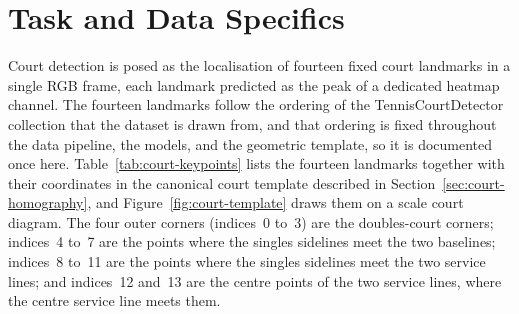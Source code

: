 \section{Task and Data Specifics}
\label{sec:court-task}

Court detection is posed as the localisation of fourteen fixed court landmarks in
a single RGB frame, each landmark predicted as the peak of a dedicated heatmap
channel. The fourteen landmarks follow the ordering of the TennisCourtDetector
collection \cite{yastrebksv2023courtdetector} that the dataset is drawn from, and
that ordering is fixed throughout the data pipeline, the models, and the
geometric template, so it is documented once here. Table~\ref{tab:court-keypoints}
lists the fourteen landmarks together with their coordinates in the canonical
court template described in Section~\ref{sec:court-homography}, and
Figure~\ref{fig:court-template} draws them on a scale court diagram. The four
outer corners (indices~0 to~3) are the doubles-court corners; indices~4 to~7 are
the points where the singles sidelines meet the two baselines; indices~8 to~11
are the points where the singles sidelines meet the two service lines; and
indices~12 and~13 are the centre points of the two service lines, where the
centre service line meets them.

